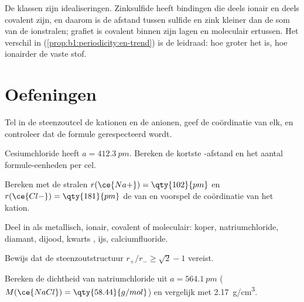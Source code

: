 \begin{remark}\label{rem:b1:crystals-ionic-covalent:continuum}
De klassen zijn idealiseringen. Zinksulfide heeft bindingen die deels
ionair en deels covalent zijn, en daarom is de afstand tussen sulfide en
zink kleiner dan de som van de ionstralen; grafiet is covalent binnen
zijn lagen en moleculair ertussen. Het verschil in 
(\cref{prop:b1:periodicity:en-trend}) is de leidraad: hoe groter het is,
hoe ionairder de vaste stof.
\end{remark}

\section{Oefeningen}

\begin{exercise}[$\star$]\label{exo:b1:crystals-ionic-covalent:1}
Tel in de steenzoutcel de kationen en de anionen, geef de coördinatie
van elk, en controleer dat de formule  gerespecteerd wordt.
\end{exercise}

\begin{exercise}[$\star$]\label{exo:b1:crystals-ionic-covalent:2}
Cesiumchloride heeft $a = \qty{412.3}{pm}$. Bereken de kortste
-afstand en het aantal formule-eenheden per cel.
\end{exercise}

\begin{exercise}[$\star$]\label{exo:b1:crystals-ionic-covalent:3}
Bereken met de stralen $r(\ce{Na+}) = \qty{102}{pm}$ en $r(\ce{Cl-}) =
\qty{181}{pm}$ de  van  en voorspel de
coördinatie van het kation.
\end{exercise}

\begin{exercise}[$\star$]\label{exo:b1:crystals-ionic-covalent:4}
Deel in als metallisch, ionair, covalent of moleculair: koper,
natriumchloride, diamant, dijood, kwarts , ijs, calciumfluoride.
\end{exercise}

\begin{exercise}[$\star\star$]\label{exo:b1:crystals-ionic-covalent:5}
Bewijs dat de steenzoutstructuur $r_+/r_- \ge \sqrt2 - 1$ vereist.
\end{exercise}

\begin{exercise}[$\star\star$]\label{exo:b1:crystals-ionic-covalent:6}
Bereken de dichtheid van natriumchloride uit $a = \qty{564.1}{pm}$
($M(\ce{NaCl}) = \qty{58.44}{g/mol}$) en vergelijk met
\qty{2.17}{g/cm^3}.
\end{exercise}

